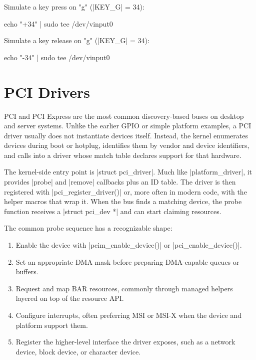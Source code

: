 \documentclass[10pt, oneside]{book}
\begin{document}
Simulate a key press on "g" (\cpp|KEY_G| = 34):

\begin{codebash}
echo "+34" | sudo tee /dev/vinput0
\end{codebash}

Simulate a key release on "g" (\cpp|KEY_G| = 34):

\begin{codebash}
echo "-34" | sudo tee /dev/vinput0
\end{codebash}



\section{PCI Drivers}
\label{sec:pci}
PCI and PCI Express are the most common discovery-based buses on desktop and
server systems.
Unlike the earlier GPIO or simple platform examples, a PCI driver usually does
not instantiate devices itself.
Instead, the kernel enumerates devices during boot or hotplug, identifies them
by vendor and device identifiers, and calls into a driver whose match table
declares support for that hardware.

The kernel-side entry point is \cpp|struct pci_driver|.
Much like \cpp|platform_driver|, it provides \cpp|probe| and \cpp|remove|
callbacks plus an ID table.
The driver is then registered with \cpp|pci_register_driver()| or, more often
in modern code, with the helper macros that wrap it.
When the bus finds a matching device, the probe function receives a
\cpp|struct pci_dev *| and can start claiming resources.

The common probe sequence has a recognizable shape:
\begin{enumerate}
  \item Enable the device with \cpp|pcim_enable_device()| or \cpp|pci_enable_device()|.
  \item Set an appropriate DMA mask before preparing DMA-capable queues or buffers.
  \item Request and map BAR resources, commonly through managed helpers layered on top of the resource API.
  \item Configure interrupts, often preferring MSI or MSI-X when the device and platform support them.
  \item Register the higher-level interface the driver exposes, such as a network device, block device, or character device.
\end{enumerate}
\end{document}
